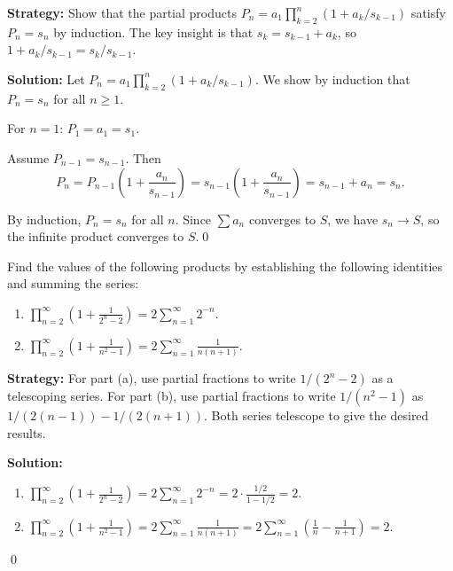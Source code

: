 \noindent\textbf{Strategy:} Show that the partial products \(P_n = a_1 \prod_{k=2}^n (1 + a_k / s_{k-1})\) satisfy \(P_n = s_n\) by induction. The key insight is that \(s_k = s_{k-1} + a_k\), so \(1 + a_k / s_{k-1} = s_k / s_{k-1}\).

\bigskip\noindent\textbf{Solution:}
Let \(P_n = a_1 \prod_{k=2}^n (1 + a_k / s_{k-1})\). We show by induction that \(P_n = s_n\) for all \(n \geq 1\).

For \(n = 1\): \(P_1 = a_1 = s_1\).

Assume \(P_{n-1} = s_{n-1}\). Then
\[P_n = P_{n-1} \left(1 + \frac{a_n}{s_{n-1}}\right) = s_{n-1} \left(1 + \frac{a_n}{s_{n-1}}\right) = s_{n-1} + a_n = s_n.\]

By induction, \(P_n = s_n\) for all \(n\). Since \(\sum a_n\) converges to \(S\), we have \(s_n \to S\), so the infinite product converges to \(S\).\qed



\begin{problembox}
\begin{problemstatement}
Find the values of the following products by establishing the following identities and summing the series:
\begin{enumerate}[label=\alph*)]
\item \(\prod_{n=2}^{\infty} \left( 1 + \frac{1}{2^n - 2} \right) = 2 \sum_{n=1}^{\infty} 2^{-n}\).
\item \(\prod_{n=2}^{\infty} \left( 1 + \frac{1}{n^2 - 1} \right) = 2 \sum_{n=1}^{\infty} \frac{1}{n(n+1)}\).
\end{enumerate}
\end{problemstatement}
\end{problembox}

\noindent\textbf{Strategy:} For part (a), use partial fractions to write \(1/(2^n-2)\) as a telescoping series. For part (b), use partial fractions to write \(1/(n^2-1)\) as \(1/(2(n-1)) - 1/(2(n+1))\). Both series telescope to give the desired results.

\bigskip\noindent\textbf{Solution:}
\begin{enumerate}[label=(\alph*)]
\item \(\prod_{n=2}^{\infty} \left( 1 + \frac{1}{2^n - 2} \right) = 2 \sum_{n=1}^{\infty} 2^{-n} = 2 \cdot \frac{1/2}{1-1/2} = 2\).

\item \(\prod_{n=2}^{\infty} \left( 1 + \frac{1}{n^2 - 1} \right) = 2 \sum_{n=1}^{\infty} \frac{1}{n(n+1)} = 2 \sum_{n=1}^{\infty} \left(\frac{1}{n} - \frac{1}{n+1}\right) = 2\).
\end{enumerate}\qed



